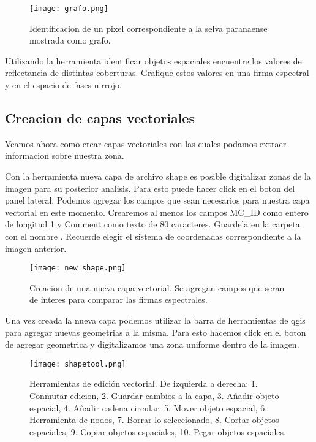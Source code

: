 \begin{figure}[htb]
\begin{center}
    \texttt{[image: grafo.png]}
\end{center}
\caption{Identificacion de un pixel correspondiente a la selva paranaense
    mostrada como grafo. }
\label{fig:grafo}
\end{figure}

\begin{act}
   Utilizando la herramienta identificar objetos espaciales encuentre los
   valores de reflectancia de distintas coberturas. Grafique estos  valores en
   una firma espectral y en el espacio de fases nirrojo.
\end{act}

\subsection{Creacion de capas vectoriales}

Veamos ahora como crear capas vectoriales con las cuales podamos extraer
informacion sobre nuestra zona.

Con la herramienta nueva capa de archivo shape es posible digitalizar zonas de
la imagen para su posterior analisis. Para esto puede hacer click en el boton
del panel lateral. Podemos agregar los campos que sean necesarios para nuestra
capa vectorial en este momento. Crearemos al menos los campos MC\_ID como entero
de longitud 1 y Comment como texto de 80 caracteres. Guardela en la carpeta 
 con el nombre . Recuerde elegir el sistema 
de coordenadas correspondiente a la imagen anterior. 

\begin{figure}
\begin{center}
    \texttt{[image: new\_shape.png]}
\end{center}
\caption{Creacion de una nueva capa vectorial. Se agregan campos que seran de
    interes para comparar las firmas espectrales. }
\label{fig:newshape}
\end{figure}


Una vez creada la nueva capa podemos utilizar la barra de herramientas de qgis
para agregar nuevas geometrias a la misma. Para esto hacemos click en el boton
de agregar geometrica y digitalizamos una zona uniforme dentro de la imagen. 
\begin{figure}
\begin{center}
    \texttt{[image: shapetool.png]}
\end{center}
\caption{Herramientas de edición vectorial. De izquierda a derecha: 1. Conmutar
    edicion, 2. Guardar cambios a la capa, 3. Añadir objeto espacial, 4. Añadir
    cadena circular, 5. Mover objeto espacial, 6. Herramienta de nodos, 7.
    Borrar lo seleccionado, 8. Cortar objetos espaciales, 9. Copiar objetos
    espaciales, 10. Pegar objetos espaciales.}
\label{fig:shapetool}
\end{figure}

